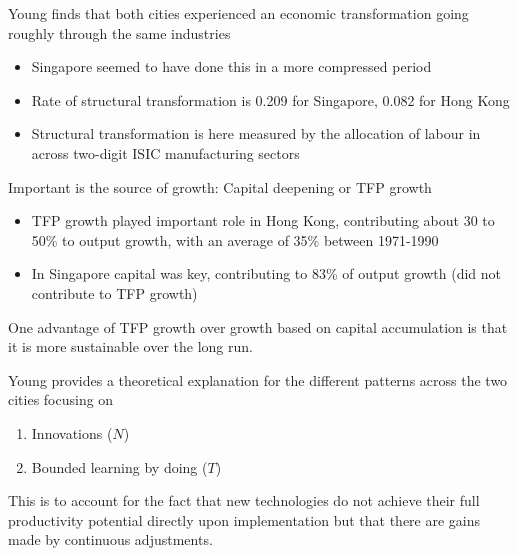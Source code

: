 \documentclass{beamer}
\begin{document}
\begin{frame}
  Young finds that both cities experienced an economic transformation going roughly through the same industries
  \begin{itemize}
    \item Singapore seemed to have done this in a more compressed period
    \item Rate of structural transformation is 0.209 for Singapore, 0.082 for Hong Kong
    \item Structural transformation is here measured by the allocation of labour in across two-digit ISIC manufacturing sectors
  \end{itemize}  
\end{frame}

\begin{frame}
Important is the source of growth: Capital deepening or TFP growth
  \begin{itemize}
    \item TFP growth played important role in Hong Kong, contributing about 30 to 50\% to output growth, with an average of 35\% between 1971-1990
    \item In Singapore capital was key, contributing to 83\% of output growth (did not contribute to TFP growth)
  \end{itemize}
  \medskip
  One advantage of TFP growth over growth based on capital accumulation is that it is more sustainable over the long run.   
\end{frame}


\begin{frame}
Young provides a theoretical explanation for the different patterns across the two cities focusing on
\begin{enumerate}
  \item Innovations ($N$)
  \item Bounded learning by doing ($T$)
\end{enumerate}
This is to account for the fact that new technologies do not achieve their full productivity potential directly upon implementation but that there are gains made by continuous adjustments.
\end{frame}
\end{document}
